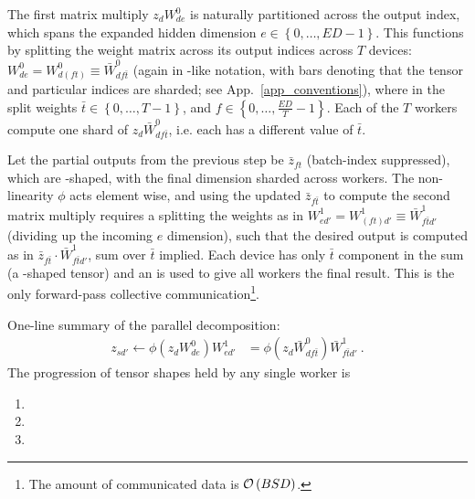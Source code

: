 \documentclass[11pt]{article}
\begin{document}
The first matrix multiply $ z _{ d }W ^{ 0 } _{ d e } $ is naturally partitioned across the output
index, which spans the expanded hidden dimension $ e\in \left \{ 0, \ldots , ED-1 \right \} $. This
functions by splitting the weight matrix across its output indices across $ T $ devices:  $ W ^{ 0 }
_{ d e }= W ^{ 0 }_{ d (f t) } \equiv  \bar{W} ^{ 0 } _{ d f \bar{t} }$ (again in
-like notation, with bars denoting that the tensor and particular indices are
sharded; see App.~\ref{app_conventions}), where in the split weights $ \bar{t}\in \left \{ 0, \ldots
, T-1 \right \} $, and $ f \in \left \{ 0, \ldots , \frac{ ED }{ T } -1\right \} $. Each of the $ T
$ workers compute one shard of $ z _{ d }\bar{W} ^{ 0 }_{ df \bar{t} } $, i.e. each has a different
value of $ \bar{t} $.


Let the partial outputs from the previous step be $ \bar{z} _{ ft }  $ (batch-index suppressed),
which are -shaped, with the final dimension sharded across workers. The
non-linearity $ \phi $ acts element wise, and using the updated $ \bar{z} _{ f \bar{t} }   $ to
compute the second matrix multiply requires a splitting the weights as in $ W ^{ 1 } _{ e d' }= W ^{
1 }_{ (ft)d' } \equiv \bar{W} ^{ 1 } _{  f \bar{t} d'}$ (dividing up the incoming $ e $ dimension),
such that the desired output is computed as in $  \bar{z} _{ f \bar{t} }\cdot \bar{W} ^{ 1 }_{ f
\bar{t}d' }$, sum over $ \bar{t} $ implied. Each device has only $\bar{t} $ component in the sum (a
-shaped tensor) and an  is used to give all workers the
final result. This  is the only forward-pass collective
communication\footnote{The amount of communicated data is $ \mathcal{O} \left( BSD \right)$.}.

One-line summary of the parallel decomposition:
\begin{align}
 z _{ sd' } \leftarrow   \phi \left (z _{ d }W ^{ 0 }_{ de }\right )W ^{ 1 } _{ ed' } &=\phi \left (z _{ d }\bar{W} ^{ 0 }_{ df \bar{t} }\right )\bar{W} ^{ 1 } _{ f \bar{t}d' } \ .
\end{align}
The progression of tensor shapes held by any single worker is
\begin{enumerate}
    \item {}
    \item {}
    \item {}
\end{enumerate}
\end{document}
